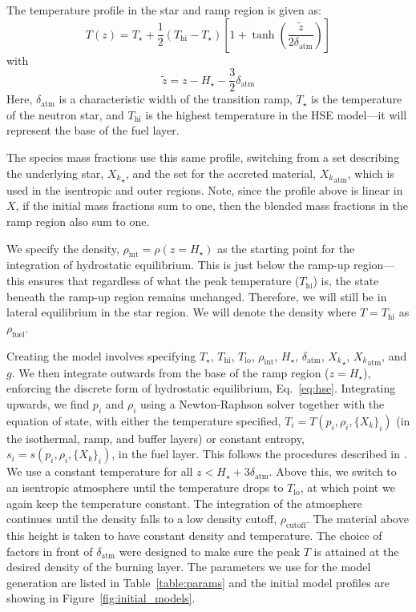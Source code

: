 \documentclass[trackchanges,preprint,times,tighten]{aastex63}
\begin{document}
The temperature profile in the star and ramp region is given as:
\begin{equation}
T(z) = T_\star + \frac{1}{2} (T_\mathrm{hi} - T_\star) \left [ 1 + \tanh\left( \frac{\tilde{z}}{2 \delta_\mathrm{atm}} \right ) \right ]
\end{equation}
with
\begin{equation}
\tilde{z} = z - H_\star - \frac{3}{2} \delta_\mathrm{atm}
\end{equation}
Here, $\delta_\mathrm{atm}$ is a characteristic width of the
transition ramp, $T_\star$ is the temperature of the neutron star, and
$T_\mathrm{hi}$ is the highest temperature in the HSE model---it will
represent the base of the fuel layer. 

The species mass fractions use this same profile, switching from a set
describing the underlying star, ${X_k}_\star$, and the set for the
accreted material, ${X_k}_\mathrm{atm}$, which is used in the
isentropic and outer regions.  Note, since the profile above is
linear in $X$, if the initial mass fractions sum to one, then the blended
mass fractions in the ramp region also sum to one.

We specify the density, $\rho_\mathrm{int} = \rho(z = H_\star)$ as the
starting point for the integration of hydrostatic equilibrium.  This
is just below the ramp-up region---this ensures that regardless of
what the peak temperature ($T_\mathrm{hi}$) is, the state beneath the
ramp-up region remains unchanged.  Therefore, we will still be in
lateral equilibrium in the star region.  We will denote the density
where $T = T_\mathrm{hi}$ as $\rho_\mathrm{fuel}$.


Creating the model involves specifying $T_\star$, $T_\mathrm{hi}$,
$T_\mathrm{lo}$, $\rho_\mathrm{int}$, $H_\star$,
$\delta_\mathrm{atm}$, ${X_k}_\star$, ${X_k}_\mathrm{atm}$, and $g$.
We then integrate outwards from the base of the ramp region ($z =
H_\star$), enforcing the discrete form of hydrostatic equilibrium,
Eq.~\ref{eq:hse}.  Integrating upwards, we find $p_i$ and $\rho_i$
using a Newton-Raphson solver together with the equation of state,
with either the temperature specified, $T_i = T(p_i, \rho_i,
\{X_k\}_i)$ (in the isothermal, ramp, and buffer layers) or constant
entropy, $s_i = s(p_i, \rho_i, \{X_k\}_i)$, in the fuel layer.  This
follows the procedures described in \citet{ppm-hse}.  We use a
constant temperature for all $z < H_\star + 3\delta_\mathrm{atm}$.
Above this, we switch to an isentropic atmosphere until the
temperature drops to $T_\mathrm{lo}$, at
which point we again keep the temperature constant.  The integration
of the atmosphere continues until the density falls to a low density
cutoff, $\rho_\mathrm{cutoff}$.  The material above this height is
taken to have constant density and temperature.  The choice of factors
in front of $\delta_\mathrm{atm}$ were designed to make sure the peak
$T$ is attained at the desired density of the burning layer.  The
parameters we use for the model generation are listed in
Table~\ref{table:params} and the initial model profiles are showing in
Figure~\ref{fig:initial_models}.
\end{document}

